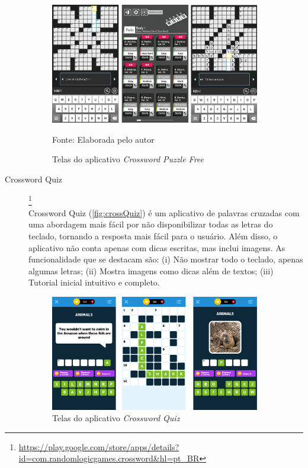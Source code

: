 \begin{description}
\begin{figure}[H]
\centering
    \caption{Telas do aplicativo \textit{Crossword Puzzle Free}}
    \label{fig:crossFree}
    \includegraphics[width=0.9\textwidth]{Figuras/crosswordPuzzleFree.jpg}
    
    Fonte: Elaborada pelo autor
\end{figure}

\item[Crossword Quiz]\footnote{\url{https://play.google.com/store/apps/details?id=com.randomlogicgames.crossword&hl=pt_BR}} \hfill \\
Crossword Quiz (\autoref{fig:crossQuiz}) é um aplicativo de palavras cruzadas com uma abordagem mais fácil por não disponibilizar todas as letras do teclado, tornando a resposta mais fácil para o usuário. Além disso, o aplicativo não conta apenas com dicas escritas, mas inclui imagens. As funcionalidade que se destacam são: (i) Não mostrar todo o teclado, apenas algumas letras; (ii) Mostra imagens como dicas além de textos; (iii) Tutorial inicial intuitivo e completo.

\begin{figure}[H]
\centering
    \caption{Telas do aplicativo \textit{Crossword Quiz}}
    \label{fig:crossQuiz}
    \includegraphics[width=0.9\textwidth]{Figuras/crosswordQuiz.jpg}
    

\end{figure}
\end{description}
